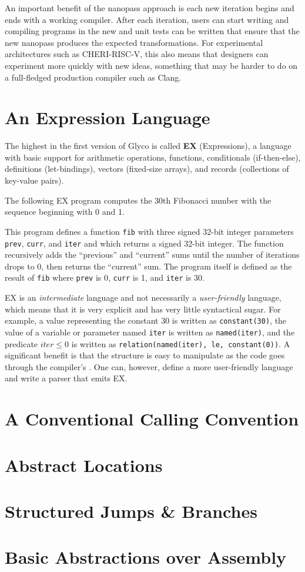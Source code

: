 \documentclass[main.tex]{subfiles}
\begin{document}
An important benefit of the nanopass approach is each new iteration begins and ends with a working compiler. After each iteration, users can start writing and compiling programs in the new \il{} and unit tests can be written that ensure that the new \gls{nanopass} produces the expected transformations. For experimental architectures such as CHERI-RISC-V, this also means that designers can experiment more quickly with new ideas, something that may be harder to do on a full-fledged production compiler such as Clang.

\section{An Expression Language}
The highest \il{} in the first version of Glyco is called \textbf{EX} (Expressions), a language with basic support for arithmetic operations, functions, conditionals (if-then-else), definitions (let-bindings), vectors (fixed-size arrays), and records (collections of key-value pairs).

The following EX program computes the 30th Fibonacci number with the sequence beginning with 0 and 1.


This program defines a function \texttt{fib} with three signed 32-bit integer parameters \texttt{prev}, \texttt{curr}, and \texttt{iter} and which returns a signed 32-bit integer. The function recursively adds the \enquote{previous} and \enquote{current} sums until the number of iterations drops to 0, then returns the \enquote{current} sum. The program itself is defined as the result of \texttt{fib} where \texttt{prev} is 0, \texttt{curr} is 1, and \texttt{iter} is 30.

EX is an \emph{intermediate} language and not necessarily a \emph{user-friendly} language, which means that it is very explicit and has very little syntactical sugar. For example, a value representing the constant 30 is written as \texttt{constant(30)}, the value of a variable or parameter named \texttt{iter} is written as \texttt{named(iter)}, and the predicate $ \textit{iter} \le 0 $ is written as \texttt{relation(named(iter), le, constant(0))}. A significant benefit is that the structure is easy to manipulate as the code goes through the compiler's . One can, however, define a more user-friendly language and write a parser that emits EX.

\section{A Conventional Calling Convention}

\section{Abstract Locations}

\section{Structured Jumps \& Branches}

\section{Basic Abstractions over Assembly}

\biblio{}
\onlyinsubfile{\glsaddall\printglossaries}
\end{document}
